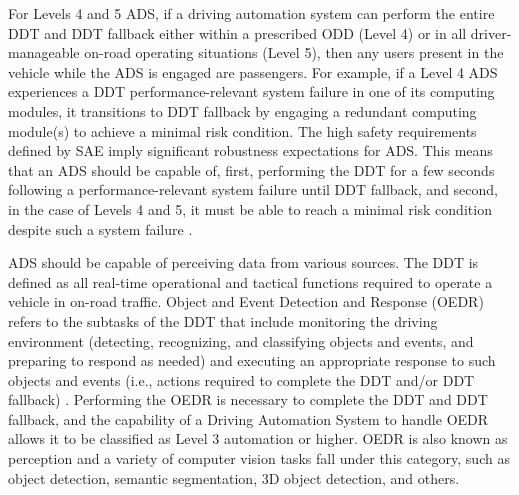 For Levels 4 and 5 ADS, if a driving automation system can perform the entire DDT and DDT fallback either within a prescribed ODD (Level 4) or in all driver-manageable on-road operating situations (Level 5), then any users present in the vehicle while the ADS is engaged are passengers. For example, if a Level 4 ADS experiences a DDT performance-relevant system failure in one of its computing modules, it transitions to DDT fallback by engaging a redundant computing module(s) to achieve a minimal risk condition.
The high safety requirements defined by SAE imply significant robustness expectations for ADS. This means that an ADS should be capable of, first, performing the DDT for a few seconds following a performance-relevant system failure until DDT fallback, and second, in the case of Levels 4 and 5, it must be able to reach a minimal risk condition despite such a system failure \cite{sae:j3016:2021apr}.


ADS should be capable of perceiving data from various sources. The DDT is defined as all real-time operational and tactical functions required to operate a vehicle in on-road traffic. Object and Event Detection and Response (OEDR) refers to the subtasks of the DDT that include monitoring the driving environment (detecting, recognizing, and classifying objects and events, and preparing to respond as needed) and executing an appropriate response to such objects and events (i.e., actions required to complete the DDT and/or DDT fallback) \cite{sae:j3016:2021apr}. Performing the OEDR is necessary to complete the DDT and DDT fallback, and the capability of a Driving Automation System to handle OEDR allows it to be classified as Level 3 automation or higher. OEDR is also known as perception and a variety of computer vision tasks fall under this category, such as object detection, semantic segmentation, 3D object detection, and others.

